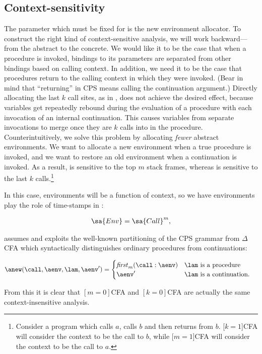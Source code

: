 \subsection{Context-sensitivity}
The parameter which must be fixed for \nCFA{} is the new 
environment allocator.
To construct the right kind of context-sensitive analysis, we will
work backward---from the abstract to the concrete.
We would like it to be the case that when a procedure is invoked,
bindings to its parameters are separated from other bindings based on
calling context.
In addition, we need it to be the case that procedures return to the
calling context in which they were invoked.
(Bear in mind that ``returning'' in CPS means calling the 
continuation argument.)
Directly allocating the last $k$ call sites, as in \kCFA, does not
achieve the desired effect, because variables get repeatedly rebound
during the evaluation of a procedure with each invocation of an
internal continuation.
This causes variables from separate invocations to merge once 
they are $k$ calls into in the procedure.
Counterintuitively, we solve this problem by allocating \emph{fewer}
abstract environments.
We want to allocate a new environment when a true procedure is invoked, and
we want to restore an old environment when a continuation is invoked.
As a result, \nCFA{} is sensitive to the top $m$ stack frames, whereas
\kCFA{} is sensitive to the last $k$ calls.\footnote{ Consider a
  program which calls $a$, calls $b$ and then returns from $b$.
  [$k=1$]CFA will consider the context to be the call to $b$, while [$m=1$]CFA
  will consider the context to be the call to $a$.}



In this case, environments will be a function of context, so we have
environments play the role of time-stamps in \kCFA:
\begin{small}\begin{align*}
  \sa{Env} = \sa{Call}^m
  \text,
\end{align*}\end{small}\nCFA{} assumes and exploits the well-known partitioning of the CPS
grammar from $\Delta$CFA \cite{dvanhorn:Might:2006:DeltaCFA} which
syntactically distinguishes ordinary procedures from continuations:
\begin{small}\begin{align*}
  \anew(\call,\aenv,\lam,\aenv') &= 
  \begin{cases}
    \mathit{first}_m(\call : \aenv)
    & \lam \text{ is a procedure }
    \\
    \aenv'
    & \lam \text{ is a continuation}
    \text. 
  \end{cases}
\end{align*}\end{small}From this it is clear that $[m=0]$CFA and $[k=0]$CFA are actually the
same context-insensitive analysis.


